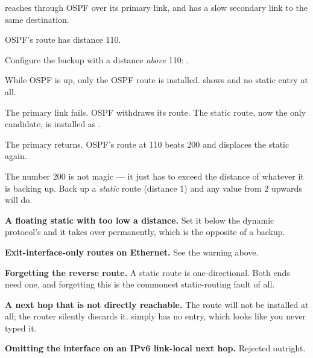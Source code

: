 \begin{worked}
 reaches  through OSPF over its primary link, and has a
slow secondary link to the same destination.

\begin{tightnum}
  \item OSPF's route has distance 110.
  \item Configure the backup with a distance \emph{above} 110:
        .
  \item While OSPF is up, only the OSPF route is installed. 
        shows  and no static entry at all.
  \item The primary link fails. OSPF withdraws its route. The static route, now
        the only candidate, is installed as .
  \item The primary returns. OSPF's route at 110 beats 200 and displaces the
        static again.
\end{tightnum}

The number 200 is not magic --- it just has to exceed the distance of whatever it
is backing up. Back up a \emph{static} route (distance 1) and any value from 2
upwards will do.
\end{worked}

\begin{pitfall}
\begin{tight}
  \item \textbf{A floating static with too low a distance.} Set it below the
        dynamic protocol's and it takes over permanently, which is the opposite
        of a backup.
  \item \textbf{Exit-interface-only routes on Ethernet.} See the warning above.
  \item \textbf{Forgetting the reverse route.} A static route is one-directional.
        Both ends need one, and forgetting this is the commonest static-routing
        fault of all.
  \item \textbf{A next hop that is not directly reachable.} The route will not be
        installed at all; the router silently discards it. 
        simply has no entry, which looks like you never typed it.
  \item \textbf{Omitting the interface on an IPv6 link-local next hop.} Rejected
        outright.
\end{tight}
\end{pitfall}

